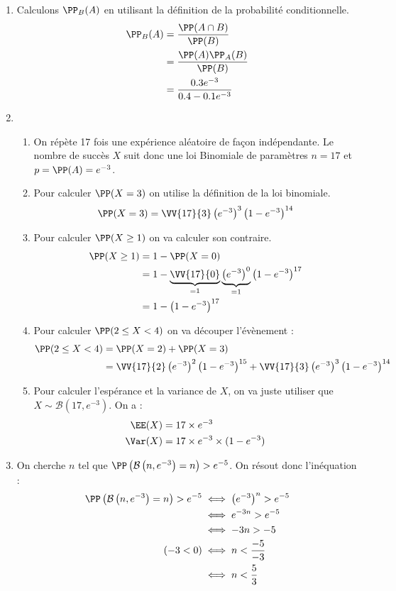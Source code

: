 \documentclass[12pt,fleqn]{report} %
\begin{document}
\begin{example}
\begin{enumerate}
		\item Calculons $\PP_B(A)$ en utilisant la définition de la probabilité conditionnelle.
		\begin{align*}
		\PP_B(A) & = \frac{\PP(A \cap B)}{\PP(B)} \\
		& = \frac{\PP(A) \PP_A(B)}{\PP(B)} \\
		& = \frac{0.3 e^{-3}}{0.4 -0.1 e^{-3} }
		\end{align*}
		\item \begin{enumerate}
			\item On répète 17 fois une expérience aléatoire de façon indépendante. Le nombre de succès $X$ suit donc une loi Binomiale de paramètres $n = 17$ et $p = \PP(A) = e^{-3}$.
			\item Pour calculer $\PP(X = 3)$ on utilise la définition de la loi binomiale.
			\[
			\PP(X = 3) = \VV{17}{3}\left(e^{-3}\right)^3 \left(1-e^{-3}\right)^{14}
			\]
			\item Pour calculer $\PP(X \geq 1)$ on va calculer son contraire.
			\begin{align*}
			\PP(X \geq 1) & = 1 - \PP(X = 0) \\
			& = 1 - \underbrace{\VV{17}{0}}_{ = 1}\underbrace{\left(e^{-3}\right)^0}_{=1}\left(1 - e^{-3}\right)^{17} \\ 
			& = 1 - \left(1-e^{-3}\right)^{17}
			\end{align*}
			\item Pour calculer $\PP( 2 \leq X < 4)$ on va découper l'évènement : 
			\begin{align*}
			\PP( 2 \leq X < 4) & = \PP(X = 2) + \PP(X = 3) \\
			& = \VV{17}{2}\left(e^{-3}\right)^2 \left(1 - e^{-3}\right)^{15} + \VV{17}{3}\left(e^{-3}\right)^3 \left(1 - e^{-3}\right)^{14}
			\end{align*}
			\item Pour calculer l'espérance et la variance de $X$, on va juste utiliser que $X \sim \mathcal{B}(17,e^{-3})$. On a :
			\begin{align*}
			\EE(X) & = 17 \times e^{-3}\\
			\Var(X)& = 17 \times e^{-3} \times (1 - e^{-3})
			\end{align*}
		\end{enumerate}
		\item On cherche $n$ tel que $\PP\left(\mathcal{B}\left(n,e^{-3}\right) = n\right) > e^{-5}$. On résout donc l'inéquation :  \begin{align*}
		\PP\left(\mathcal{B}\left(n,e^{-3}\right)  = n\right) > e^{-5}
		& \iff \left(e^{-3}\right)^n > e^{-5} \\
		& \iff e^{-3n} > e^{-5} \\
		& \iff -3n >  -5 \\ 
		(-3 < 0) & \iff n < \frac{-5}{-3} \\
		& \iff n < \frac{5}{3}
		\end{align*}
	\end{enumerate}
\end{example}
\end{document}
